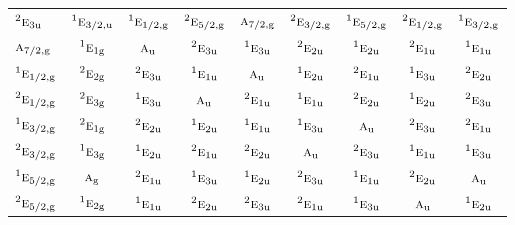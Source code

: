 \documentclass[10pt,a4paper]{article}
\numberwithin{equation}{section}
\newcommand{\irr}[1]{\text{\normalfont\scshape #1}}
\newcommand{\conjpair}[1]{{}^{#1}}
\newcommand{\ptag}[1]{\mathrm{#1}}
\begin{document}
{\begin{longtable}{@{}lcccccccc@{}}
$\conjpair{2}\irr{e}_{3\ptag{u}}$ & $\conjpair{1}\irr{e}_{3/2,\ptag{u}}$ & $\conjpair{1}\irr{e}_{1/2,\ptag{g}}$ & $\conjpair{2}\irr{e}_{5/2,\ptag{g}}$ & $\irr{a}_{7/2,\ptag{g}}$ & $\conjpair{2}\irr{e}_{3/2,\ptag{g}}$ & $\conjpair{1}\irr{e}_{5/2,\ptag{g}}$ & $\conjpair{2}\irr{e}_{1/2,\ptag{g}}$ & $\conjpair{1}\irr{e}_{3/2,\ptag{g}}$\\
$\irr{a}_{7/2,\ptag{g}}$ & $\conjpair{1}\irr{e}_{1\ptag{g}}$ & $\irr{a}_{\ptag{u}}$ & $\conjpair{2}\irr{e}_{3\ptag{u}}$ & $\conjpair{1}\irr{e}_{3\ptag{u}}$ & $\conjpair{2}\irr{e}_{2\ptag{u}}$ & $\conjpair{1}\irr{e}_{2\ptag{u}}$ & $\conjpair{2}\irr{e}_{1\ptag{u}}$ & $\conjpair{1}\irr{e}_{1\ptag{u}}$\\
$\conjpair{1}\irr{e}_{1/2,\ptag{g}}$ & $\conjpair{2}\irr{e}_{2\ptag{g}}$ & $\conjpair{2}\irr{e}_{3\ptag{u}}$ & $\conjpair{1}\irr{e}_{1\ptag{u}}$ & $\irr{a}_{\ptag{u}}$ & $\conjpair{1}\irr{e}_{2\ptag{u}}$ & $\conjpair{2}\irr{e}_{1\ptag{u}}$ & $\conjpair{1}\irr{e}_{3\ptag{u}}$ & $\conjpair{2}\irr{e}_{2\ptag{u}}$\\
$\conjpair{2}\irr{e}_{1/2,\ptag{g}}$ & $\conjpair{2}\irr{e}_{3\ptag{g}}$ & $\conjpair{1}\irr{e}_{3\ptag{u}}$ & $\irr{a}_{\ptag{u}}$ & $\conjpair{2}\irr{e}_{1\ptag{u}}$ & $\conjpair{1}\irr{e}_{1\ptag{u}}$ & $\conjpair{2}\irr{e}_{2\ptag{u}}$ & $\conjpair{1}\irr{e}_{2\ptag{u}}$ & $\conjpair{2}\irr{e}_{3\ptag{u}}$\\
$\conjpair{1}\irr{e}_{3/2,\ptag{g}}$ & $\conjpair{2}\irr{e}_{1\ptag{g}}$ & $\conjpair{2}\irr{e}_{2\ptag{u}}$ & $\conjpair{1}\irr{e}_{2\ptag{u}}$ & $\conjpair{1}\irr{e}_{1\ptag{u}}$ & $\conjpair{1}\irr{e}_{3\ptag{u}}$ & $\irr{a}_{\ptag{u}}$ & $\conjpair{2}\irr{e}_{3\ptag{u}}$ & $\conjpair{2}\irr{e}_{1\ptag{u}}$\\
$\conjpair{2}\irr{e}_{3/2,\ptag{g}}$ & $\conjpair{1}\irr{e}_{3\ptag{g}}$ & $\conjpair{1}\irr{e}_{2\ptag{u}}$ & $\conjpair{2}\irr{e}_{1\ptag{u}}$ & $\conjpair{2}\irr{e}_{2\ptag{u}}$ & $\irr{a}_{\ptag{u}}$ & $\conjpair{2}\irr{e}_{3\ptag{u}}$ & $\conjpair{1}\irr{e}_{1\ptag{u}}$ & $\conjpair{1}\irr{e}_{3\ptag{u}}$\\
$\conjpair{1}\irr{e}_{5/2,\ptag{g}}$ & $\irr{a}_{\ptag{g}}$ & $\conjpair{2}\irr{e}_{1\ptag{u}}$ & $\conjpair{1}\irr{e}_{3\ptag{u}}$ & $\conjpair{1}\irr{e}_{2\ptag{u}}$ & $\conjpair{2}\irr{e}_{3\ptag{u}}$ & $\conjpair{1}\irr{e}_{1\ptag{u}}$ & $\conjpair{2}\irr{e}_{2\ptag{u}}$ & $\irr{a}_{\ptag{u}}$\\
$\conjpair{2}\irr{e}_{5/2,\ptag{g}}$ & $\conjpair{1}\irr{e}_{2\ptag{g}}$ & $\conjpair{1}\irr{e}_{1\ptag{u}}$ & $\conjpair{2}\irr{e}_{2\ptag{u}}$ & $\conjpair{2}\irr{e}_{3\ptag{u}}$ & $\conjpair{2}\irr{e}_{1\ptag{u}}$ & $\conjpair{1}\irr{e}_{3\ptag{u}}$ & $\irr{a}_{\ptag{u}}$ & $\conjpair{1}\irr{e}_{2\ptag{u}}$\\

\end{longtable}}
\end{document}
